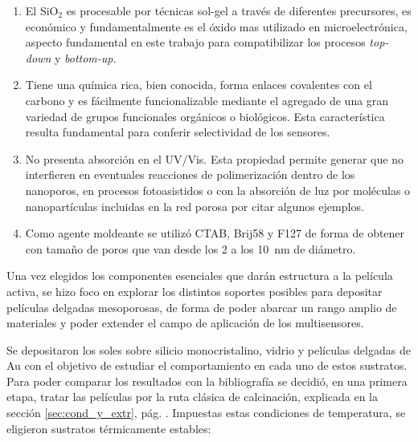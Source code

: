 		\begin{enumerate}

		\item El SiO$_2$ es procesable por técnicas sol-gel a través de diferentes precursores, es económico y fundamentalmente es el óxido mas utilizado en microelectrónica, aspecto fundamental en este trabajo para compatibilizar los procesos \textit{top-down} y \textit{bottom-up}.

		\item Tiene una química rica, bien conocida, forma enlaces covalentes con el carbono y es fácilmente funcionalizable mediante el agregado de una gran variedad de grupos funcionales orgánicos o biológicos. Esta característica resulta fundamental para conferir selectividad de los sensores.

		\item No presenta absorción en el UV/Vis. Esta propiedad permite generar \pdm\space que no interfieren en eventuales reacciones de polimerización dentro de los nanoporos, en procesos fotoasistidos o con la absorción de luz por moléculas o nanopartículas incluidas en la red porosa por citar algunos ejemplos.

		\item Como agente moldeante se utilizó CTAB, Brij58 y F127  de forma de obtener \pdm\space con tamaño de poros que van desde los 2 a los \SI{10}{\nm} de diámetro.

		\end{enumerate}
	
	Una vez elegidos los componentes esenciales que darán estructura a la película activa, se hizo foco en explorar los distintos soportes posibles para depositar películas delgadas mesoporosas, de forma de poder abarcar un rango amplio de materiales y poder extender el campo de aplicación de los multisensores.
	
	Se depositaron los soles sobre silicio monocristalino, vidrio y películas delgadas de Au con el objetivo de estudiar el comportamiento en cada uno de estos sustratos. Para poder comparar los resultados con la bibliografía\cite{Soler-Illia2006,Brinker1990} se decidió, en una primera etapa, tratar las películas por la ruta clásica de calcinación, explicada en la sección \ref{sec:cond_y_extr}, pág. \pageref{sec:cond_y_extr}. Impuestas estas condiciones de temperatura, se eligieron sustratos térmicamente estables:

